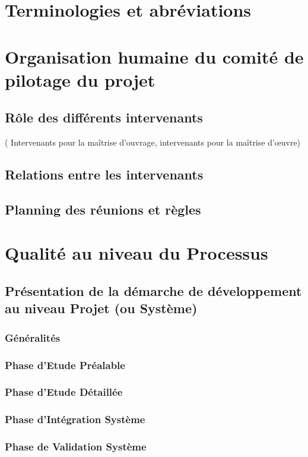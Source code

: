 \documentclass[a4paper]{article}
\begin{document}
\section{Terminologies et abréviations}

\section{Organisation humaine du comité de pilotage du projet}
\subsection{Rôle des différents intervenants }
( Intervenants pour la maîtrise d'ouvrage, intervenants pour la maîtrise d'œuvre)
\subsection{Relations entre les intervenants}
\subsection{Planning des réunions et règles}

\section{Qualité au niveau du Processus}
\subsection{Présentation de la démarche de développement au niveau Projet (ou Système)}
\subsubsection{Généralités}
\subsubsection{Phase d'Etude Préalable}
\subsubsection{Phase d'Etude Détaillée}
\subsubsection{Phase d'Intégration Système}
\subsubsection{Phase de Validation Système}
\end{document}
